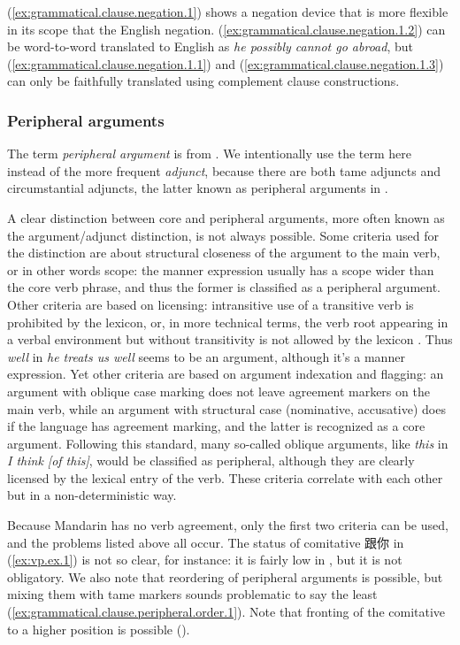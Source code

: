 \documentclass[UTF8, a4paper, oneside, scheme=plain, 12pt]{ctexrep}
\newcommand*{\term}[1]{\emph{#1}}
\newcommand{\form}[1]{\emph{#1}}
\begin{document}
(\ref{ex:grammatical.clause.negation.1}) shows a negation device that is more flexible in its scope
that the English negation.
(\ref{ex:grammatical.clause.negation.1.2}) can be word-to-word translated to English as
\form{he possibly cannot go abroad},
but (\ref{ex:grammatical.clause.negation.1.1}) and (\ref{ex:grammatical.clause.negation.1.3})
can only be faithfully translated using complement clause constructions.

\subsubsection{Peripheral arguments}\label{sec:grammatical.clause.peripheral}

The term \term{peripheral argument} is from \citet{dixon2009basic}.
We intentionally use the term here instead of the more frequent \term{adjunct},
because there are both \acs{tame} adjuncts and circumstantial adjuncts,
the latter known as peripheral arguments in \citet{dixon2009basic}.

A clear distinction between core and peripheral arguments,
more often known as the argument/adjunct distinction, is not always possible.
Some criteria used for the distinction are about structural closeness of the argument to the main verb, or in other words scope:
the manner expression usually has a scope wider than the core verb phrase,
and thus the former is classified as a peripheral argument.
Other criteria are based on licensing: intransitive use of a transitive verb is prohibited by the lexicon,
or, in more technical terms, the verb root appearing in a verbal environment but without transitivity is not allowed by the lexicon \citep{siddiqi2009syntax}.
Thus \form{well} in \form{he treats us well} seems to be an argument, although it's a manner expression.
Yet other criteria are based on argument indexation and flagging:
an argument with oblique case marking does not leave agreement markers on the main verb,
while an argument with structural case (nominative, accusative) does
if the language has agreement marking,
and the latter is recognized as a core argument.
Following this standard, many so-called oblique arguments,
like \form{this} in \form{I think [of this]}, would be classified as peripheral,
although they are clearly licensed by the lexical entry of the verb.
These criteria correlate with each other but in a non-deterministic way.

Because Mandarin has no verb agreement, only the first two criteria can be used,
and the problems listed above all occur.
The status of comitative 跟你 in (\ref{ex:vp.ex.1}) is not so clear, for instance:
it is fairly low in , but it is not obligatory.
We also note that reordering of peripheral arguments is possible,
but mixing them with \acs{tame} markers sounds problematic to say the least
(\ref{ex:grammatical.clause.peripheral.order.1}).
Note that fronting of the comitative to a higher position is possible ().
\end{document}
